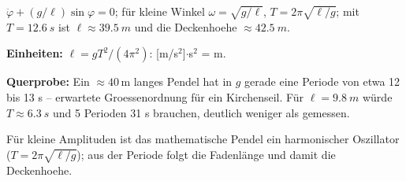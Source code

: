 \begin{ergebnis}
$\ddot\varphi+(g/\ell)\sin\varphi=0$; für kleine Winkel
$\omega=\sqrt{g/\ell}$, $T=2\pi\sqrt{\ell/g}$; mit $T=\qty{12.6}{s}$ ist
$\ell\approx\qty{39.5}{m}$ und die Deckenhoehe $\approx\qty{42.5}{m}$.
\end{ergebnis}

\begin{kontrolle}
\textbf{Einheiten:} $\ell=gT^2/(4\pi^2)$: [m/s$^2$]$\cdot$s$^2$ = m. \checkmark

\textbf{Querprobe:} Ein ${}\approx40\,\mathrm m$ langes Pendel hat in $g$
gerade eine Periode von etwa 12 bis 13 s -- erwartete Groessenordnung für ein
Kirchenseil. Für $\ell=\qty{9.8}{m}$ würde $T\approx\qty{6.3}{s}$ und 5
Perioden 31 s brauchen, deutlich weniger als gemessen. \checkmark
\end{kontrolle}

\begin{merksatz}
Für kleine Amplituden ist das mathematische Pendel ein harmonischer
Oszillator ($T=2\pi\sqrt{\ell/g}$); aus der Periode folgt die Fadenlänge
und damit die Deckenhoehe.
\end{merksatz}
